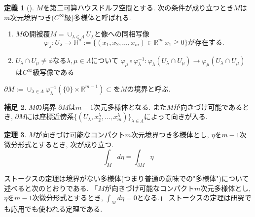 \documentclass[dvipdfmx,a4paper,11pt]{article}
\newcommand{\R}{\mathbb{R}}
\theoremstyle{definition}
\newtheorem{thm}{定理}
\newtheorem{dfn}[thm]{定義}
\newtheorem{rem}[thm]{補足}
\begin{document}
    \begin{tcolorbox}[
    colback = white,
    colframe = green!35!black,
    fonttitle = \bfseries,
    breakable = true]
    \begin{dfn}[]
    $M$を第二可算ハウスドルフ空間とする. 次の条件が成り立つとき$M$は$m$次元境界つき($C^{\infty}$級)多様体と呼ばれる.
     \begin{enumerate}
     \setlength{\parskip}{0cm}
  \setlength{\itemsep}{2pt} 
     \item $M$の開被覆$M = \cup_{\lambda \in \Lambda} U_{\lambda}$と像への同相写像
     $$
     \varphi_{\lambda} : U_{\lambda} \rightarrow \mathbb{H}^n := \{ (x_1, x_2, \ldots, x_m) \in \R^m | x_1 \geqq 0\}
     \text{が存在する.}
     $$
     \item $U_\lambda \cap U_\mu \neq \phi$なる$\lambda, \mu \in \Lambda$について
    $
   \varphi_\mu\circ \varphi_{\lambda}^{-1} : \varphi_{\lambda}(U_\lambda \cap U_\mu) \rightarrow \varphi_{\mu}(U_\lambda \cap U_\mu) 
    $
    は$C^{\infty}$級写像である
     \end{enumerate}
 $\partial M := \cup_{\lambda \in \Lambda} \varphi_{\lambda}^{-1}(\{ 0\} \times \R^{m-1}) \subset $を$M$の境界と呼ぶ.
    \end{dfn}
    \end{tcolorbox}   
\begin{rem}
$M$の境界 $\partial M$は$m-1$次元多様体となる. また$M$が向きづけ可能であるとき, $\partial M$には座標近傍系$\{(U_\lambda, x_{2}^{\lambda}, \ldots, x_{m}^{\lambda})\}_{\lambda \in \Lambda}$によって向きが入る.
\end{rem}

  \begin{tcolorbox}[
    colback = white,
    colframe = green!35!black,
    fonttitle = \bfseries,
    breakable = true]
\begin{thm}
$M$が向きづけ可能なコンパクト$m$次元境界つき多様体とし, $\eta$を$m-1$次微分形式とするとき, 次が成り立つ. 
$$
\int_{M} d \eta = \int_{\partial M} \eta 
$$
    \end{thm}
    \end{tcolorbox} 
    
ストークスの定理は境界がない多様体(つまり普通の意味での"多様体")について述べると次のとおりである.
「$M$が向きづけ可能なコンパクト$m$次元多様体とし, $\eta$を$m-1$次微分形式とするとき, $\int_{M} d \eta =0 $となる.」
ストークスの定理は研究でも応用でも使われる定理である. 
\newpage
\end{document}
